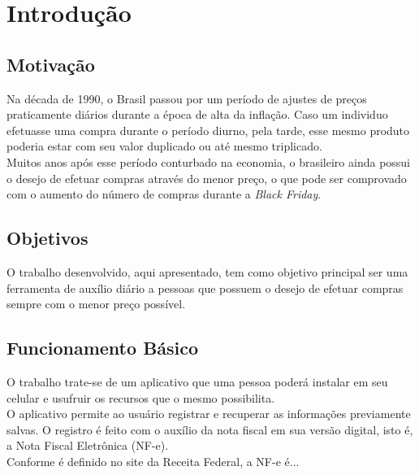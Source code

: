 \chapter{Introdução}

\section{Motivação}

Na década de 1990, o Brasil passou por um período de ajustes de preços praticamente diários durante a época de alta da inflação. Caso um individuo efetuasse uma compra durante o período diurno, pela tarde, esse mesmo produto poderia estar com seu valor duplicado ou até mesmo triplicado.\\

Muitos anos após esse período conturbado na economia, o brasileiro ainda possui o desejo de efetuar compras através do menor preço, o que pode ser comprovado com o aumento do número de compras durante a \textit{Black Friday}.\\

\section{Objetivos}

O trabalho desenvolvido, aqui apresentado, tem como objetivo principal ser uma ferramenta de auxílio diário a pessoas que possuem o desejo de efetuar compras sempre com o menor preço possível.

\section{Funcionamento Básico}

O trabalho trate-se de um aplicativo que uma pessoa poderá instalar em seu celular e usufruir os recursos que o mesmo possibilita.\\
O aplicativo permite ao usuário registrar e recuperar as informações previamente salvas. O registro é feito com o auxílio da nota fiscal em sua versão digital, isto é, a Nota Fiscal Eletrônica (NF-e).\\

Conforme é definido no site da Receita Federal, a NF-e é...\\

